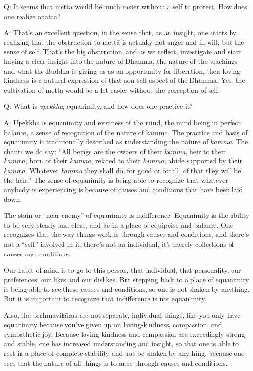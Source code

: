 \vspace{\the\qaskip}
Q: It seems that metta would be much easier without a self to protect.
How does one realize anatta?

\vspace{\the\qaskip}
A: That’s an excellent question, in the sense that, as an insight, one
starts by realizing that the obstruction to mettā is actually not anger
and ill-will, but the sense of self. That’s the big obstruction, and as
we reflect, investigate and start having a clear insight into the nature
of Dhamma, the nature of the teachings and what the Buddha is giving us
as an opportunity for liberation, then loving-kindness is a natural
expression of that non-self aspect of the Dhamma. Yes, the cultivation
of metta would be a lot easier without the perception of self.

\vspace{\the\qaskip}
Q: What is \emph{upekkha}, equanimity, and how does one practice it?

\vspace{\the\qaskip}
A: Upekkha is equanimity and evenness of the mind, the mind being in
perfect balance, a sense of recognition of the nature of kamma. The
practice and basis of equanimity is traditionally described as
understanding the nature of \emph{kamma}. The chants we do say: “All
beings are the owners of their \emph{kamma}, heir to their \emph{kamma},
born of their \emph{kamma}, related to their \emph{kamma}, abide
supported by their \emph{kamma}. Whatever \emph{kamma} they shall do,
for good or for ill, of that they will be the heir.” The sense of
equanimity is being able to recognize that whatever anybody is
experiencing is because of causes and conditions that have been laid
down.

The stain or “near enemy” of equanimity is indifference. Equanimity is
the ability to be very steady and clear, and be in a place of equipoise
and balance. One recognizes that the way things work is through causes
and conditions, and there’s not a “self” involved in it, there’s not an
individual, it’s merely collections of causes and conditions.

Our habit of mind is to go to this person, that individual, that
personality, our preferences, our likes and our dislikes. But stepping
back to a place of equanimity is being able to see these causes and
conditions, so one is not shaken by anything. But it is important to
recognize that indifference is not equanimity.

Also, the brahmavihāras are not separate, individual things, like you
only have equanimity because you’ve given up on loving-kindness,
compassion, and sympathetic joy. Because loving-kindness and compassion
are exceedingly strong and stable, one has increased understanding and
insight, so that one is able to rest in a place of complete stability
and not be shaken by anything, because one sees that the nature of all
things is to arise through causes and conditions.

